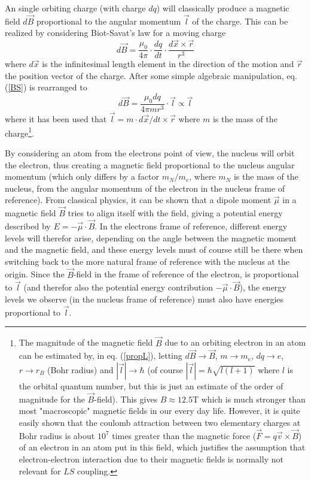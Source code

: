 \documentclass[a4paper]{article}
\begin{document}
An single orbiting charge (with charge $dq$) will classically produce a magnetic field $d\vec{B}$ proportional to the angular momentum $\vec{l}$ of the charge. This can be realized by considering Biot-Savat's law for a moving charge
\begin{equation}
d\vec{B} = \frac{\mu_0}{4\pi} \cdot \frac{dq}{dt} \cdot \frac{d\vec{x} \times \vec{r}}{r^3} \label{BS}
\end{equation}
where $d\vec{x}$ is the infinitesimal length element in the direction of the motion and $\vec{r}$ the position vector of the charge. After some simple algebraic manipulation, eq. (\ref{BS}) is rearranged to
\begin{equation}
d\vec{B} = \frac{\mu_0 dq}{4\pi mr^3} \cdot \vec{l} \propto \vec{l}		\label{propL}
\end{equation}
where it has been used that $\vec{l}=m \cdot d\vec{x}/dt \times \vec{r}$ where $m$ is the mass of the charge\footnote{The magnitude of the magnetic field $\vec{B}$ due to an orbiting electron in an atom can be estimated by, in eq. (\ref{propL}), letting $d\vec{B}\rightarrow \vec{B}$, $m\rightarrow m_e$, $dq \rightarrow e$, $r \rightarrow r_B$ (Bohr radius) and $|\vec{l}|\rightarrow \hbar$ (of course $|\vec{l}|=\hbar \sqrt{l(l+1)}$ where $l$ is the orbital quantum number, but this is just an estimate of the order of magnitude for the $\vec{B}$-field). This gives $B \approx 12.5$T which is much stronger than most "macroscopic" magnetic fields in our every day life. However, it is quite easily shown that the coulomb attraction between two elementary charges at Bohr radius is about $10^7$ times greater than the magnetic force ($\vec{F}=q\vec{v}\times \vec{B}$) of an electron in an atom put in this field, which justifies the assumption that electron-electron interaction due to their magnetic fields is normally not relevant for $LS$ coupling.}.

By considering an atom from the electrons point of view, the nucleus will orbit the electron, thus creating a magnetic field proportional to the nucleus angular momentum (which only differs by a factor $m_N/m_e$, where $m_N$ is the mass of the nucleus, from the angular momentum of the electron in the nucleus frame of reference). From classical physics, it can be shown that a dipole moment $\vec{\mu}$ in a magnetic field $\vec{B}$ tries to align itself with the field, giving a potential energy described by $E=-\vec{\mu}\cdot\vec{B}$. In the electrons frame of reference, different energy levels will therefor arise, depending on the angle between the magnetic moment and the magnetic field, and these energy levels must of course still be there when switching back to the more natural frame of reference with the nucleus at the origin. Since the $\vec{B}$-field in the frame of reference of the electron, is proportional to $\vec{l}$ (and therefor also the potential energy contribution $-\vec{\mu}\cdot\vec{B}$), the energy levels we observe (in the nucleus frame of reference) must also have energies proportional to $\vec{l}$. 
\end{document}
